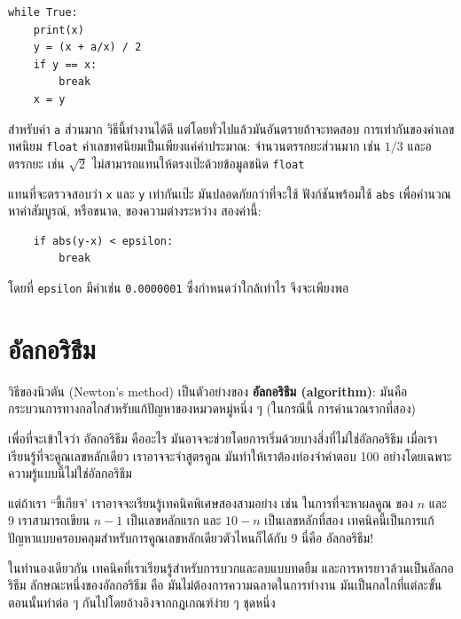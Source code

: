 \begin{verbatim}
while True:
    print(x)
    y = (x + a/x) / 2
    if y == x:
        break
    x = y
\end{verbatim}
%
สำหรับค่า {\tt a} ส่วนมาก วิธีนี้ทำงานได้ดี แต่โดยทั่วไปแล้วมันอันตรายถ้าจะทดสอบ
การเท่ากันของค่าเลขทศนิยม {\tt float} ค่าเลขทศนิยมเป็นเพียงแค่ค่าประมาณ: จำนวนตรรกยะส่วนมาก
เช่น {\scriptsize$1/3$} และอตรรกยะ เช่น {\scriptsize$\sqrt{2}$} ไม่สามารถแทนให้ตรงเป๊ะด้วยข้อมูลชนิด {\tt float}

แทนที่จะตรวจสอบว่า {\tt x} และ {\tt y} เท่ากันเป๊ะ มันปลอดภัยกว่าที่จะใช้
ฟังก์ชันพร้อมใช้ {\tt abs} เพื่อคำนวณหาค่าสัมบูรณ์, หรือขนาด, ของความต่างระหว่าง
สองค่านี้:

\begin{verbatim}
    if abs(y-x) < epsilon:
        break
\end{verbatim}
%
โดยที่ \verb"epsilon" มีค่าเช่น {\tt 0.0000001} ซึ่งกำหนดว่าใกล้เท่าไร
จึงจะเพียงพอ


\section{อัลกอริธึม} %

วิธีของนิวตัน (Newton's method) เป็นตัวอย่างของ {\bf อัลกอริธึม (algorithm)}: 
มันคือกระบวนการทางกลไกสำหรับแก้ปัญหาของหมวดหมู่หนึ่ง ๆ (ในกรณีนี้ การคำนวณรากที่สอง) 

เพื่อที่จะเข้าใจว่า อัลกอริธึม คืออะไร มันอาจจะช่วยโดยการเริ่มด้วยบางสิ่งที่ไม่ใช่อัลกอริธึม
เมื่อเราเรียนรู้ที่จะคูณเลขหลักเดียว เราอาจจะจำสูตรคูณ มันทำให้เราต้องท่องจำคำตอบ 100 
อย่างโดยเฉพาะ ความรู้แบบนี้ไม่ใช่อัลกอริธึม

แต่ถ้าเรา ``ขี้เกียจ' เราอาจจะเรียนรู้เทคนิคพิเศษสองสามอย่าง เช่น ในการที่จะหาผลคูณ
ของ {\scriptsize$n$} และ 9 เราสามารถเขียน {\scriptsize$n-1$} เป็นเลขหลักแรก และ {\scriptsize$10-n$} เป็นเลขหลักที่สอง
เทคนิคนี้เป็นการแก้ปัญหาแบบครอบคลุมสำหรับการคูณเลขหลักเดียวตัวไหนก็ได้กับ 9
นี่คือ อัลกอริธึม!

ในทำนองเดียวกัน เทคนิคที่เราเรียนรู้สำหรับการบวกและลบแบบทดยืม 
และการหารยาวล้วนเป็นอัลกอริธึม ลักษณะหนึ่งของอัลกอริธึม คือ มันไม่ต้องการความฉลาดในการทำงาน 
มันเป็นกลไกที่แต่ละขั้นตอนนั้นทำต่อ ๆ กันไปโดยอ้างอิงจากกฎเกณฑ์ง่าย ๆ ชุดหนึ่ง 


